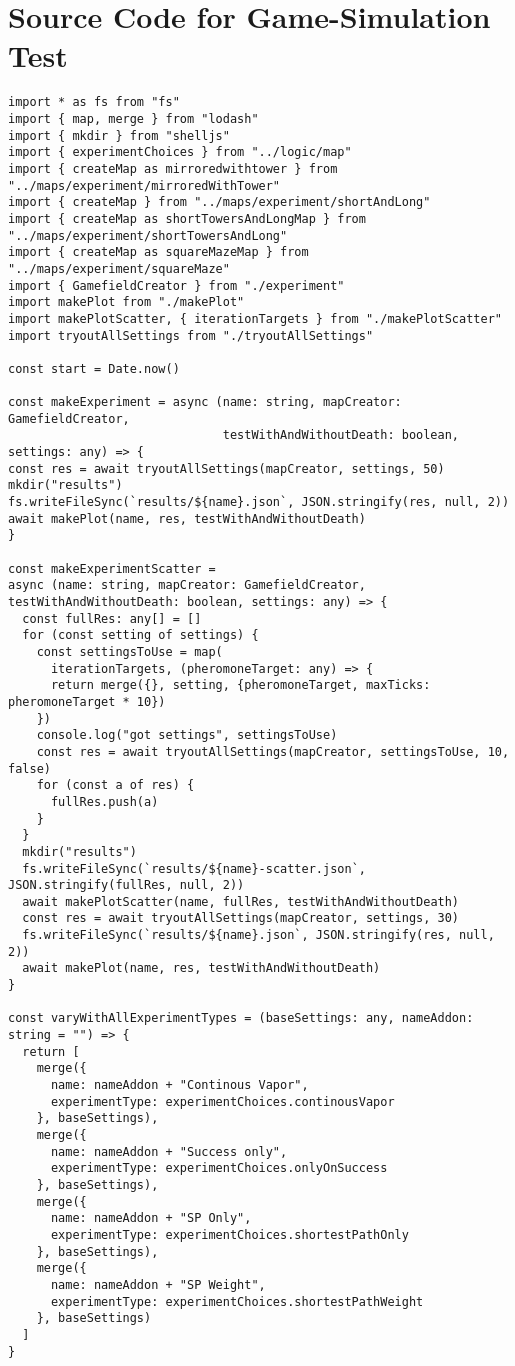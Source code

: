 \section{Source Code for Game-Simulation Test}
\label{src:testgamesim}
\begin{lstlisting}
import * as fs from "fs"
import { map, merge } from "lodash"
import { mkdir } from "shelljs"
import { experimentChoices } from "../logic/map"
import { createMap as mirroredwithtower } from "../maps/experiment/mirroredWithTower"
import { createMap } from "../maps/experiment/shortAndLong"
import { createMap as shortTowersAndLongMap } from "../maps/experiment/shortTowersAndLong"
import { createMap as squareMazeMap } from "../maps/experiment/squareMaze"
import { GamefieldCreator } from "./experiment"
import makePlot from "./makePlot"
import makePlotScatter, { iterationTargets } from "./makePlotScatter"
import tryoutAllSettings from "./tryoutAllSettings"

const start = Date.now()

const makeExperiment = async (name: string, mapCreator: GamefieldCreator,
                              testWithAndWithoutDeath: boolean, settings: any) => {
const res = await tryoutAllSettings(mapCreator, settings, 50)
mkdir("results")
fs.writeFileSync(`results/${name}.json`, JSON.stringify(res, null, 2))
await makePlot(name, res, testWithAndWithoutDeath)
}

const makeExperimentScatter =
async (name: string, mapCreator: GamefieldCreator, testWithAndWithoutDeath: boolean, settings: any) => {
  const fullRes: any[] = []
  for (const setting of settings) {
    const settingsToUse = map(
      iterationTargets, (pheromoneTarget: any) => {
      return merge({}, setting, {pheromoneTarget, maxTicks: pheromoneTarget * 10})
    })
    console.log("got settings", settingsToUse)
    const res = await tryoutAllSettings(mapCreator, settingsToUse, 10, false)
    for (const a of res) {
      fullRes.push(a)
    }
  }
  mkdir("results")
  fs.writeFileSync(`results/${name}-scatter.json`, JSON.stringify(fullRes, null, 2))
  await makePlotScatter(name, fullRes, testWithAndWithoutDeath)
  const res = await tryoutAllSettings(mapCreator, settings, 30)
  fs.writeFileSync(`results/${name}.json`, JSON.stringify(res, null, 2))
  await makePlot(name, res, testWithAndWithoutDeath)
}

const varyWithAllExperimentTypes = (baseSettings: any, nameAddon: string = "") => {
  return [
    merge({
      name: nameAddon + "Continous Vapor",
      experimentType: experimentChoices.continousVapor
    }, baseSettings),
    merge({
      name: nameAddon + "Success only",
      experimentType: experimentChoices.onlyOnSuccess
    }, baseSettings),
    merge({
      name: nameAddon + "SP Only",
      experimentType: experimentChoices.shortestPathOnly
    }, baseSettings),
    merge({
      name: nameAddon + "SP Weight",
      experimentType: experimentChoices.shortestPathWeight
    }, baseSettings)
  ]
}


\end{lstlisting}
